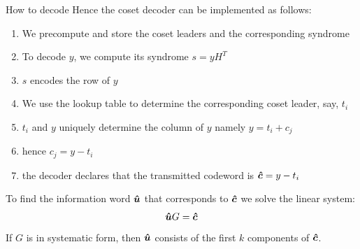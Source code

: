 \begin{parag}{How to decode}
    Hence the coset decoder can be implemented as follows:
    \begin{enumerate}
        \item We precompute and store the coset leaders and the corresponding syndrome
        \item To decode $y$, we compute its syndrome $s = yH^T$
        \item $s$ encodes the row of $y$
        \item We use the lookup table to determine the corresponding coset leader, say, $t_i$
        \item $t_i$ and $y$ uniquely determine the column of $y$ namely $y =  t_i + c_j$
           \item hence $c_j =  y - t_i$
           \item the decoder  declares that the transmitted codeword is $\bm{\hat{c}} =  y -t_i$
    \end{enumerate}
    To find the information word $\bm{\hat{u}}$ that corresponds to $\bm{\hat{c}}$ we solve the linear system:
    \begin{align*}  \bm{\hat{u}}G =  \bm{\hat{c}}\end{align*}
    If $G$ is in systematic form, then $\bm{\hat{u}}$ consists of the first $k$ components of $\bm{\hat{c}}$.
\end{parag}


